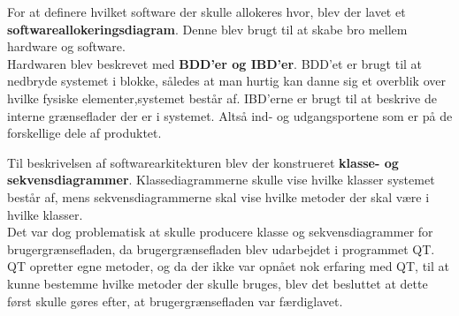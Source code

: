 For at definere hvilket software der skulle allokeres hvor, blev der lavet et \textbf{softwareallokeringsdiagram}. Denne blev brugt til at skabe bro mellem hardware og software.\\

Hardwaren blev beskrevet med \textbf{BDD’er og IBD’er}. BDD’et er brugt til at nedbryde systemet i blokke, således at man hurtig kan danne sig et overblik over hvilke fysiske elementer,systemet består af. 
IBD’erne er brugt til at beskrive de interne grænseflader der er i systemet. Altså ind- og udgangsportene som er på de forskellige dele af produktet.

Til beskrivelsen af softwarearkitekturen blev der konstrueret \textbf{klasse- og sekvensdiagrammer}. Klassediagrammerne skulle vise hvilke klasser systemet består af, mens sekvensdiagrammerne skal vise hvilke metoder der skal være i hvilke klasser. \\

Det var dog problematisk at skulle producere klasse og sekvensdiagrammer for brugergrænsefladen, da brugergrænsefladen blev udarbejdet i programmet QT. QT opretter egne metoder, og da der ikke var opnået nok erfaring med QT, til at kunne bestemme hvilke metoder der skulle bruges, blev det besluttet at dette først skulle gøres efter, at brugergrænsefladen var færdiglavet.
